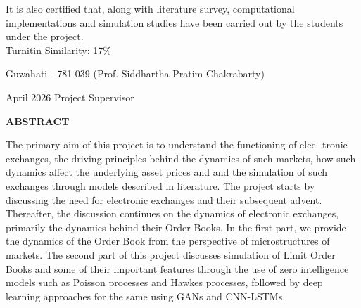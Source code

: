 \documentclass[12pt,a4paper]{report}
\theoremstyle{plain}
\theoremstyle{definition}
\theoremstyle{remark}
\begin{document}
\noindent
It is also certified that, along with literature survey,
computational implementations and simulation studies have been carried out by the students under the project. \\

\noindent
Turnitin Similarity: 17\%
%

\vspace{4cm}

\noindent Guwahati - 781 039 \hfill (Prof. Siddhartha Pratim Chakrabarty)

\noindent April 2026 \hfill Project Supervisor

\clearpage

\begin{center}
{\Large{\bf{ABSTRACT}}}
\end{center}


The primary aim of this project is to understand the functioning of elec-
tronic exchanges, the driving principles behind the dynamics of such markets,
how such dynamics affect the underlying asset prices and and the simulation of
such exchanges through models described in literature. The project starts by discussing the need for electronic exchanges and their subsequent advent. Thereafter, the discussion continues on the dynamics of electronic exchanges, primarily the dynamics behind their Order Books. In the first part, we provide the dynamics of the Order Book from the perspective of microstructures of markets. The second part of this project discusses simulation of Limit Order Books and some of their important features through the use of zero intelligence models such as Poisson processes and Hawkes processes, followed by deep learning approaches for the same using GANs and CNN-LSTMs.

\clearpage



\tableofcontents
\clearpage
\listoffigures


\newpage

\setcounter{page}{1}





















\end{document}
